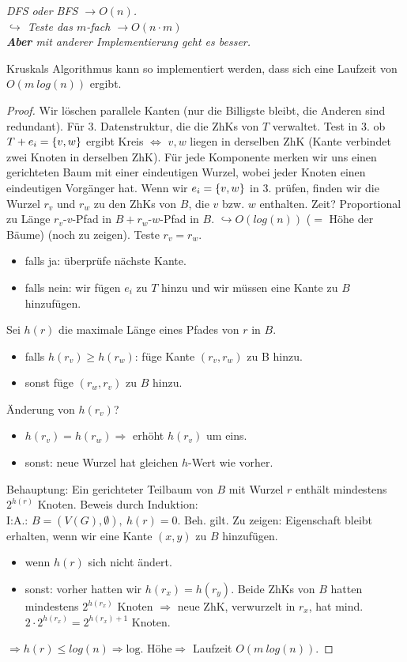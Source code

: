 \textit{DFS oder BFS $\to O(n)$.\\
$\hookrightarrow$ Teste das $m$-fach $\to O(n\cdot m)$\\
\textbf{Aber} mit anderer Implementierung geht es besser.}
\begin{satz}
	Kruskals Algorithmus kann so implementiert werden, dass sich eine Laufzeit von $O(m~log(n))$ ergibt.
\end{satz}
\begin{proof}
	Wir löschen parallele Kanten (nur die Billigste bleibt, die Anderen sind redundant). Für 3. Datenstruktur, die die ZhKs von $T$ verwaltet. Test in 3. ob $T+e_i = \{v,w\}$ ergibt Kreis $\Leftrightarrow$ $v,w$ liegen in derselben ZhK (Kante verbindet zwei Knoten in derselben ZhK). Für jede Komponente merken wir uns einen gerichteten Baum mit einer eindeutigen Wurzel, wobei jeder Knoten einen eindeutigen Vorgänger hat. Wenn wir $e_i=\{v,w\}$ in 3. prüfen, finden wir die Wurzel $r_v$ und $r_w$ zu den ZhKs von $B$, die $v$ bzw. $w$ enthalten. Zeit? Proportional zu Länge $r_v$-$v$-Pfad in $B + r_w$-$w$-Pfad in $B$. $\hookrightarrow O(log(n))$ ($=$ Höhe der Bäume) (noch zu zeigen). Teste $r_v = r_w$.
	\begin{itemize}
		\item falls ja: überprüfe nächste Kante.
		\item falls nein: wir fügen $e_i$ zu $T$ hinzu und wir müssen eine Kante zu $B$ hinzufügen.
	\end{itemize}
	Sei $h(r)$ die maximale Länge eines Pfades von $r$ in $B$.
	\begin{itemize}
		\item falls $h(r_v)\ge h(r_w)$: füge Kante $(r_v, r_w)$ zu B hinzu.
		\item sonst füge $(r_w, r_v)$ zu $B$ hinzu.
	\end{itemize}
	Änderung von $h(r_v)$?
	\begin{itemize}
		\item $h(r_v) = h(r_w) \Rightarrow$ erhöht $h(r_v)$ um eins.
		\item sonst: neue Wurzel hat gleichen $h$-Wert wie vorher.
	\end{itemize}
	Behauptung: Ein gerichteter Teilbaum von $B$ mit Wurzel $r$ enthält mindestens $2^{h(r)}$ Knoten. Beweis durch Induktion:\\
	I:A.: $B=(V(G), \emptyset),~h(r)=0$. Beh. gilt. Zu zeigen: Eigenschaft bleibt erhalten, wenn wir eine Kante $(x,y)$ zu $B$ hinzufügen.
	\begin{itemize}
		\item wenn $h(r)$ sich nicht ändert.
		\item sonst: vorher hatten wir $h(r_x) = h(r_y)$. Beide ZhKs von $B$ hatten mindestens $2^{h(r_x)}$ Knoten $\Rightarrow$ neue ZhK, verwurzelt in $r_x$, hat mind. $2\cdot2^{h(r_x)} = 2^{h(r_x)+1}$ Knoten. 
	\end{itemize}
	$\Rightarrow h(r) \le log(n) \Rightarrow \text{log. Höhe} \Rightarrow$ Laufzeit $O(m~log(n))$.
\end{proof}
